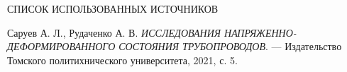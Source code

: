 \begin{center}
    \MakeUppercase{\large Список использованных источников}
\end{center}

\renewcommand{\refname}{} %
\vspace{-11mm}

\makeatletter
\renewcommand\@biblabel[1]{#1.}
\makeatother

\begin{thebibliography}{9}

     Саруев А. Л., Рудаченко А. В. \textit{ИССЛЕДОВАНИЯ НАПРЯЖЕННО-ДЕФОРМИРОВАННОГО СОСТОЯНИЯ ТРУБОПРОВОДОВ}. — Издательство Томского политихнического университета, 2021, с. 5.
    
\end{thebibliography}
